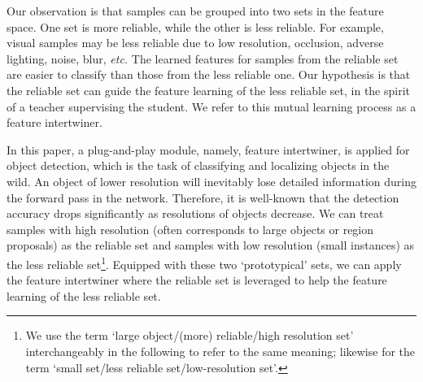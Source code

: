 \documentclass{article} \usepackage{iclr2019_conference,times}
\begin{document}
Our observation is that samples can be grouped into two sets in the feature space. One set is more reliable, while the other is less reliable. For example, visual samples may be less reliable due to low resolution, occlusion, adverse lighting, noise, blur, \textit{etc.} The learned features for samples from the reliable set are easier to classify than those from the less reliable one. Our hypothesis is that the reliable set can guide the feature learning of the less reliable set, in the spirit of a teacher supervising the student. We refer to this mutual learning process as a feature intertwiner.






In this paper, a plug-and-play module, namely, feature intertwiner, is applied for object detection, which is the task of classifying and localizing objects in the wild. An object of lower resolution will inevitably lose detailed information during the forward pass in the network. Therefore, it is well-known that the detection accuracy drops significantly as resolutions of objects decrease.
We can treat samples with high resolution (often corresponds to large objects or region proposals) as the reliable set and samples with low resolution (small instances) as the less reliable set\footnote{We use the term `large object/(more) reliable/high resolution set' interchangeably in the following to refer to the same meaning; likewise for the term `small set/less reliable set/low-resolution set'.}.
Equipped with these two `prototypical' sets, we can apply the feature intertwiner where the reliable set is leveraged to help the feature learning of the less reliable set. 
\end{document}
